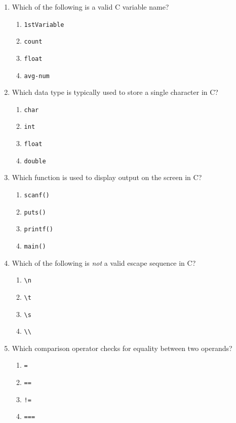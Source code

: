 \documentclass[a4paper,12pt]{article}
\begin{document}
\begin{enumerate}
  \item Which of the following is a valid C variable name?
  \begin{enumerate}[label=(\alph*)]
    \item \texttt{1stVariable}
    \item \texttt{count}
    \item \texttt{float}
    \item \texttt{avg-num}
  \end{enumerate}

  \item Which data type is typically used to store a single character in C?
  \begin{enumerate}[label=(\alph*)]
    \item \texttt{char}
    \item \texttt{int}
    \item \texttt{float}
    \item \texttt{double}
  \end{enumerate}

  \item Which function is used to display output on the screen in C?
  \begin{enumerate}[label=(\alph*)]
    \item \texttt{scanf()}
    \item \texttt{puts()}
    \item \texttt{printf()}
    \item \texttt{main()}
  \end{enumerate}

  \item Which of the following is \emph{not} a valid escape sequence in C?
  \begin{enumerate}[label=(\alph*)]
    \item \texttt{\textbackslash n}
    \item \texttt{\textbackslash t}
    \item \texttt{\textbackslash s}
    \item \texttt{\textbackslash\textbackslash}
  \end{enumerate}

  \item Which comparison operator checks for equality between two operands?
  \begin{enumerate}[label=(\alph*)]
    \item \texttt{=}
    \item \texttt{==}
    \item \texttt{!=}
    \item \texttt{===}
  \end{enumerate}


\end{enumerate}
\end{document}
